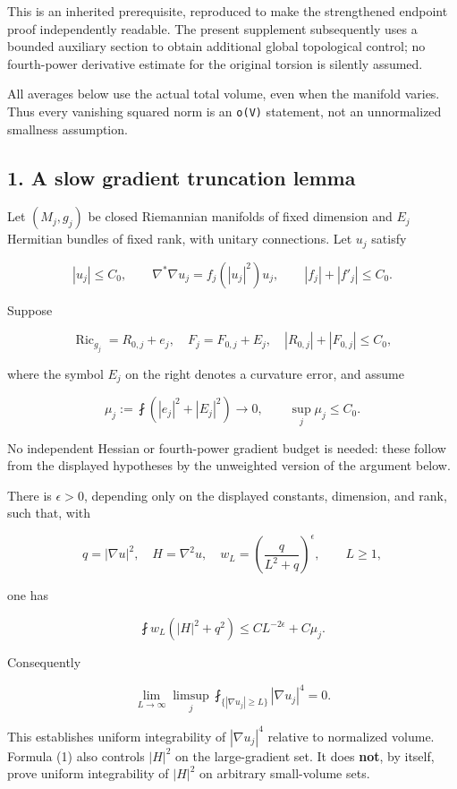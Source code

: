 \documentclass[11pt]{article}
\begin{document}
This is an inherited prerequisite, reproduced to make the strengthened
endpoint proof independently readable. The present supplement
subsequently uses a bounded auxiliary section to obtain additional
global topological control; no fourth-power derivative estimate for the
original torsion is silently assumed.

All averages below use the actual total volume, even when the manifold
varies. Thus every vanishing squared norm is an \texttt{o(V)} statement,
not an unnormalized smallness assumption.

\hypertarget{a-slow-gradient-truncation-lemma}{%
\subsection{1. A slow gradient truncation
lemma}\label{a-slow-gradient-truncation-lemma}}

Let \((M_j,g_j)\) be closed Riemannian manifolds of fixed dimension and
\(E_j\) Hermitian bundles of fixed rank, with unitary connections. Let
\(u_j\) satisfy

\[
 |u_j|\le C_0,\qquad \nabla^*\nabla u_j=f_j(|u_j|^2)u_j,
 \qquad |f_j|+|f'_j|\le C_0.
\]

Suppose

\[
 \operatorname{Ric}_{g_j}=R_{0,j}+e_j,
 \quad F_j=F_{0,j}+E_j,
 \quad |R_{0,j}|+|F_{0,j}|\le C_0,
\]

where the symbol \(E_j\) on the right denotes a curvature error, and
assume

\[
 \mu_j:=\fint(|e_j|^2+|E_j|^2)\longrightarrow0,
 \qquad \sup_j\mu_j\le C_0.
\]

No independent Hessian or fourth-power gradient budget is needed: these
follow from the displayed hypotheses by the unweighted version of the
argument below.

There is \(\epsilon>0\), depending only on the displayed constants,
dimension, and rank, such that, with

\[
 q=|\nabla u|^2,\quad H=\nabla^2u,\quad
 w_L=\left(\frac q{L^2+q}\right)^\epsilon,
 \qquad L\ge1,
\]

one has

\[
 \boxed{\fint w_L(|H|^2+q^2)
              \le C L^{-2\epsilon}+C\mu_j.}\tag{1}
\]

Consequently

\[
 \boxed{\lim_{L\to\infty}\limsup_j
       \fint_{\{|\nabla u_j|\ge L\}}|\nabla u_j|^4=0.}\tag{2}
\]

This establishes uniform integrability of \(|\nabla u_j|^4\) relative to
normalized volume. Formula (1) also controls \(|H|^2\) on the
large-gradient set. It does \textbf{not}, by itself, prove uniform
integrability of \(|H|^2\) on arbitrary small-volume sets.
\end{document}
